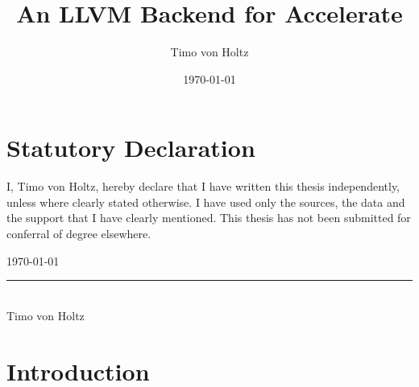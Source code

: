 \documentclass[a4paper,bibliography=totocnumbered,parskip=half,draft]{scrbook}
\begin{document}
\frontmatter

\titlehead{
  {\large Arbeitsgruppe Programmiersprachen und Übersetzerkonstruktion}\\
  Institut für Informatik\\
  Christian-Albrechts-Universität zu Kiel}
\subject{Master Thesis}
\date{\today}
\title{An LLVM Backend for Accelerate}
\author{Timo von Holtz}
\publishers{Betreuer: Priv.-Doz. Dr. Frank Huch}
\maketitle

\chapter*{Statutory Declaration}

I, Timo von Holtz, hereby declare that I have written this thesis independently, unless where clearly stated otherwise.
I have used only the sources, the data and the support that I have clearly mentioned.
This thesis has not been submitted for conferral of degree elsewhere. 

\today
\begin{flushright}
\rule{6cm}{0.4pt} \\
Timo von Holtz
\end{flushright}
\clearpage

\listoftodos
\tableofcontents   %
\listoffigures     %
\listoftables      %
\lstlistoflistings %
\mainmatter

\chapter{Introduction}
\Blindtext
{}
\Blindtext 



\appendix

\backmatter
\printbibliography
\end{document}
